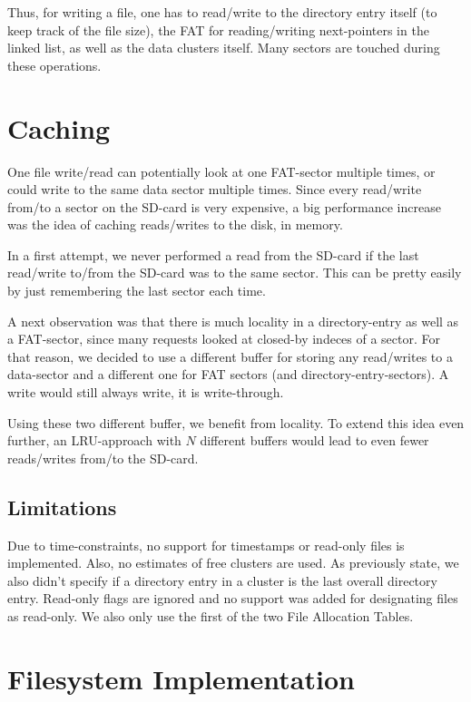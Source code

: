 Thus, for writing a file, one has to read/write to the directory entry itself (to keep track of the file size), the FAT for reading/writing next-pointers
in the linked list, as well as the data clusters itself. Many sectors are touched during these operations.

\section{Caching}
One file write/read can potentially look at one FAT-sector multiple times,
or could write to the same data sector multiple times. Since every 
read/write from/to a sector on the SD-card is very expensive, a big 
performance increase was the idea of caching reads/writes to the disk, in memory.

In a first attempt, we never performed a read from the SD-card if 
the last read/write to/from the SD-card was to the same sector. This can 
be pretty easily by just remembering the last sector each time.

A next observation was that there is much locality in a directory-entry 
as well as a FAT-sector, since many requests looked at closed-by indeces
of a sector. For that reason, we decided to use a different buffer 
for storing any read/writes to a data-sector and a different one for 
FAT sectors (and directory-entry-sectors). 
A write would still always write, it is write-through.

Using these two different buffer, we benefit from locality.
To extend this idea even further, an LRU-approach with $N$ different 
buffers would lead to even fewer reads/writes from/to the SD-card.

\subsection{Limitations}
Due to time-constraints, no support for timestamps or read-only files is implemented.
Also, no estimates of free clusters are used. As previously state, we also didn't specify if a directory entry in a cluster is the last 
overall directory entry. Read-only flags are ignored and no support was added for designating files as read-only.
We also only use the first of the two File Allocation Tables.

\section{Filesystem Implementation}

